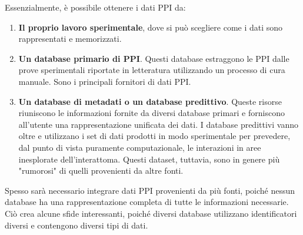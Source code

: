 \documentclass[11pt]{article}
\begin{document}
Essenzialmente, è possibile ottenere i dati PPI da:
\begin{enumerate}
\setlength{\itemsep}{1pt}
  \setlength{\parskip}{0pt}
  \setlength{\parsep}{0pt}
\item \textbf{Il proprio lavoro sperimentale}, dove si può scegliere come i dati sono rappresentati e memorizzati.
\item \textbf{Un database primario di PPI}. Questi database estraggono le PPI dalle prove sperimentali riportate in letteratura utilizzando un processo di cura manuale. Sono i principali fornitori di dati PPI.
\item \textbf{Un database di metadati o un database predittivo}. Queste risorse riuniscono le informazioni fornite da diversi database primari e forniscono all'utente una rappresentazione unificata dei dati. 
I database predittivi vanno oltre e utilizzano i set di dati prodotti in modo sperimentale per prevedere, dal punto di vista puramente computazionale, le interazioni in aree inesplorate dell'interattoma. Questi dataset, tuttavia, sono in genere più "rumorosi" di quelli provenienti da altre fonti.
\end{enumerate}

Spesso sarà necessario integrare dati PPI provenienti da più fonti, poiché nessun database ha una rappresentazione completa di tutte le informazioni necessarie. Ciò crea alcune sfide interessanti, poiché diversi database utilizzano  identificatori diversi e contengono diversi tipi di dati.\\
\end{document}
